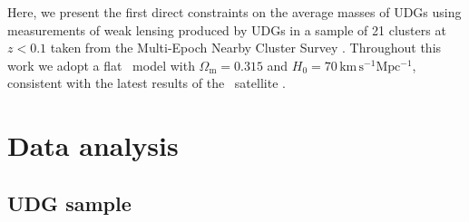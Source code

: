 \documentclass[usenatbib,fleqn]{mnras}
\begin{document}
Here, we present the first direct constraints on the average masses of UDGs using measurements of weak lensing produced by UDGs in a sample of 21 clusters at $z<0.1$ taken from the Multi-Epoch Nearby Cluster Survey \citep[\meneacs][]{sand12}. Throughout this work we adopt a flat \lcdm\ model with $\Omega_\mathrm{m}=0.315$ and $H_0=70\,\mathrm{km\,s^{-1}Mpc^{-1}}$, consistent with the latest results of the \planck\ satellite \citep{planck15xiii}.

\section{Data analysis}
\label{s:data}


\subsection{UDG sample}
\end{document}
